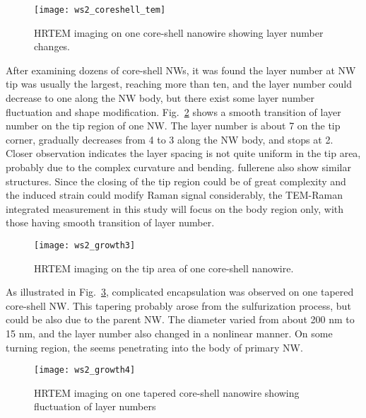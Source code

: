 \begin{figure}[htb]
\centering
\texttt{[image: ws2\_coreshell\_tem]}
\caption[TEM imaging on core-shell NWs: 1]{HRTEM imaging on one core-shell nanowire showing layer number changes.}
\label{fig:ch5ws2tem1}
\end{figure}
After examining dozens of core-shell NWs, it was found the  layer number at NW tip was usually the largest, reaching more than ten, and the layer number could decrease to one along the NW body, but there exist some layer number fluctuation and shape modification. Fig.~\ref{fig:ch5ws2tem3} shows a smooth transition of  layer number on the tip region of one NW. The layer number is about 7 on the tip corner, gradually decreases from 4 to 3 along the NW body, and stops at 2. Closer observation indicates the layer spacing is not quite uniform in the tip area, probably due to the complex curvature and bending.  fullerene also show similar structures. Since the closing of the tip region could be of great complexity and the induced strain could modify Raman signal considerably, the TEM-Raman integrated measurement in this study will focus on the body region only, with those having smooth transition of layer number.
\begin{figure}[htb]
\centering
\texttt{[image: ws2\_growth3]}
\caption[TEM imaging on core-shell NWs: 2]{HRTEM imaging on the tip area of one core-shell nanowire.}
\label{fig:ch5ws2tem3}
\end{figure}

As illustrated in Fig.~\ref{fig:ch5ws2tem4}, complicated  encapsulation was observed on one tapered core-shell NW. This tapering probably arose from the sulfurization process, but could be also due to the parent  NW. The diameter varied from about 200 nm to 15 nm, and the  layer number also changed in a nonlinear manner. On some turning region, the  seems penetrating into the body of primary  NW. 

\begin{figure}[htb]
\centering
\texttt{[image: ws2\_growth4]}
\caption[TEM imaging on core-shell NWs: 3]{HRTEM imaging on one tapered core-shell nanowire showing fluctuation of layer numbers}
\label{fig:ch5ws2tem4}
\end{figure}


